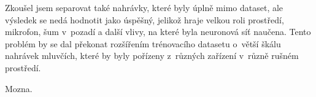 Zkoušel jsem separovat také nahrávky, které byly úplně mimo dataset, ale výsledek se nedá hodnotit jako úspěšný, jelikož hraje velkou roli prostředí, mikrofon, šum v~pozadí a další vlivy, na které byla neuronová síť naučena. Tento problém by se dal překonat rozšířením trénovacího datasetu o~větší škálu nahrávek mluvčích, které by byly pořízeny z~různých zařízení v~různě rušném prostředí.

Mozna.


